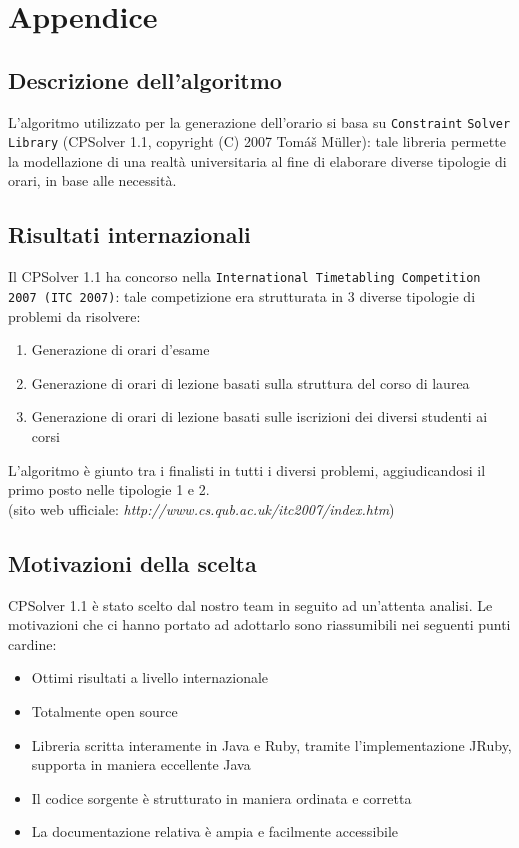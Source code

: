 \documentclass[11pt,a4paper]{article}
\begin{document}
\section*{Appendice}
\subsection*{Descrizione dell'algoritmo}
L'algoritmo utilizzato per la generazione dell'orario si basa su \verb|Constraint| \verb|Solver Library| (CPSolver 1.1,  copyright (C) 2007 Tomáš Müller): tale libreria permette la modellazione di una realtà universitaria al fine di elaborare diverse tipologie di orari, in base alle necessità.
\subsection*{Risultati internazionali}
Il CPSolver 1.1 ha concorso nella \verb|International Timetabling Competition| \verb|2007 (ITC 2007)|: tale competizione era strutturata in 3 diverse tipologie di problemi da risolvere:
\begin{enumerate}
 \item Generazione di orari d'esame
 \item Generazione di orari di lezione basati sulla struttura del corso di laurea
 \item Generazione di orari di lezione basati sulle iscrizioni dei diversi studenti ai corsi
\end{enumerate}
L'algoritmo è giunto tra i finalisti in tutti i diversi problemi, aggiudicandosi il primo posto nelle tipologie 1 e 2.
\\
(sito web ufficiale: \textit{http://www.cs.qub.ac.uk/itc2007/index.htm})
\subsection*{Motivazioni della scelta}
CPSolver 1.1 è stato scelto dal nostro team in seguito ad un'attenta analisi. Le motivazioni che ci hanno portato ad adottarlo sono riassumibili nei seguenti punti cardine:
\begin{itemize}
 \item Ottimi risultati a livello internazionale
 \item Totalmente open source
 \item Libreria scritta interamente in Java e Ruby, tramite l'implementazione JRuby, supporta in maniera eccellente Java
 \item Il codice sorgente è strutturato in maniera ordinata e corretta
 \item La documentazione relativa è ampia e facilmente accessibile
\end{itemize}
\end{document}
